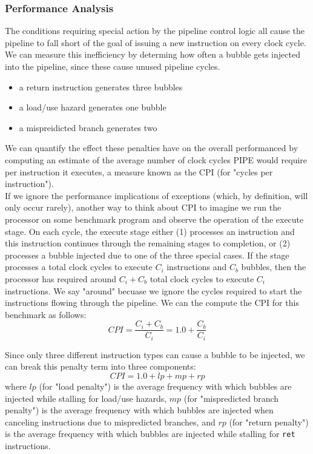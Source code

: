 \documentclass[11pt]{article}
\begin{document}
\subsubsection{Performance Analysis}
\label{sec:orge88236a}
The conditions requiring special action by the pipeline control logic all cause the pipeline to fall short of the goal of issuing a new instruction on every clock cycle. We can measure this inefficiency by determing how often a bubble gets injected into the pipeline, since these cause unused pipeline cycles.\\
\begin{itemize}
\item a return instruction generates three bubbles\\
\item a load/use hazard generates one bubble\\
\item a mispreidicted branch generates two\\
\end{itemize}

We can quantify the effect these penalties have on the overall performanced by computing an estimate of the average number of clock cycles PIPE would require per instruction it executes, a measure known as the CPI (for "cycles per instruction").\\

If we ignore the performance implications of exceptions (which, by definition, will only occur rarely), another way to think about CPI to imagine we run the processor on some benchmark program and observe the operation of the execute stage. On each cycle, the execute stage either (1) processes an instruction and this instruction continues through the remaining stages to completion, or (2) processes a bubble injected due to one of the three special cases. If the stage processes a total clock cycles to execute \(C_i\) instructions and \(C_b\) bubbles, then the processor has required around \(C_i + C_b\) total clock cycles to execute \(C_i\) instructions. We say "around" becuase we ignore the cycles required to start the instructions flowing through the pipeline. We can the compute the CPI for this benchmark as follows:\\
\begin{equation}
CPI = \frac{C_i + C_b}{C_i} = 1.0 + \frac{C_b}{C_i}
\end{equation}

Since only three different instruction types can cause a bubble to be injected, we can break this penalty term into three components:\\
\begin{equation}
CPI = 1.0 + lp + mp + rp
\end{equation}
where \(lp\) (for "load penalty") is the average frequency with which bubbles are injected while stalling for load/use hazards, \(mp\) (for "mispredicted branch penalty") is the average frequency with which bubbles are injected when canceling instructions due to mispredicted branches, and \(rp\) (for "return penalty") is the average frequency with which bubbles are injected while stalling for \texttt{ret} instructions.\\
\end{document}
